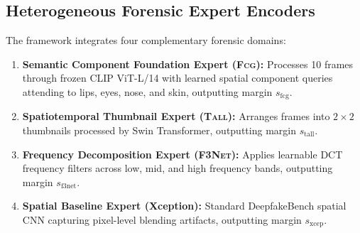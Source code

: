 \documentclass[conference]{IEEEtran}
\newcommand{\tall}{\textsc{Tall}}
\newcommand{\fcg}{\textsc{Fcg}}
\newcommand{\fthreenet}{\textsc{F3Net}}
\begin{document}
\subsection{Heterogeneous Forensic Expert Encoders}
The framework integrates four complementary forensic domains:
\begin{enumerate}
    \item \textbf{Semantic Component Foundation Expert (\fcg{}):} Processes 10 frames through frozen CLIP ViT-L/14 with learned spatial component queries attending to lips, eyes, nose, and skin, outputting margin $s_{\text{fcg}}$.
    \item \textbf{Spatiotemporal Thumbnail Expert (\tall{}):} Arranges frames into $2\times2$ thumbnails processed by Swin Transformer, outputting margin $s_{\text{tall}}$.
    \item \textbf{Frequency Decomposition Expert (\fthreenet{}):} Applies learnable DCT frequency filters across low, mid, and high frequency bands, outputting margin $s_{\text{f3net}}$.
    \item \textbf{Spatial Baseline Expert (Xception):} Standard DeepfakeBench spatial CNN capturing pixel-level blending artifacts, outputting margin $s_{\text{xcep}}$.
\end{enumerate}
\end{document}
